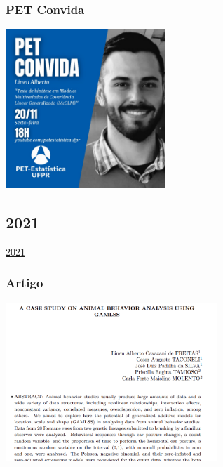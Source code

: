 \documentclass[10pt,
  aspectratio=169,
  serif,
  mathserif,
  professionalfont,
  compress,
  handout,
  ]{beamer}\usepackage[]{graphicx}\usepackage[]{color}
\begin{document}
\begin{frame}

\frametitle{PET Convida}

\begin{center}
  \includegraphics[height=6cm]{img/petcv.jpeg}
\end{center}

\end{frame}


\subsection{2021}

\begin{frame}[c, allowframebreaks]

\begin{center}

  {\huge \href{https://lineu96.github.io/st/}{2021}}
  
\end{center}

\end{frame}



\begin{frame}

\frametitle{Artigo}

\begin{center}
  \includegraphics[height=6cm]{img/paper.png}
\end{center}

\end{frame}
\end{document}
